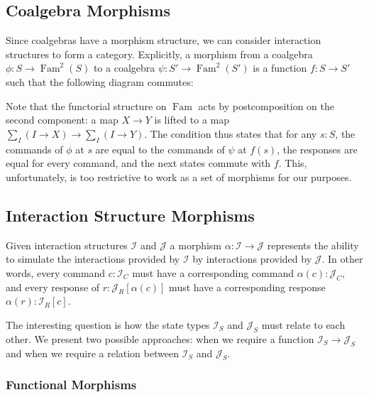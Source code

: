 \documentclass{article}
\theoremstyle{definition}
\newcommand{\mc}[1]{\mathcal{#1}}
\newcommand{\iss}[1]{\mathcal{#1}_S}
\newcommand{\isc}[1]{\mathcal{#1}_C}
\newcommand{\isr}[1]{\mathcal{#1}_R}
\DeclareMathOperator{\Fam}{Fam}
\begin{document}
    \subsection{Coalgebra Morphisms}

    Since coalgebras have a morphism
    structure, we can consider interaction structures to form a category.  Explicitly, a morphism from a coalgebra $\phi
    : S \to \Fam^2(S)$ to a coalgebra $\psi : S' \to \Fam^2(S')$ is a function $f : S \to S'$ such that the following
    diagram commutes:

    \begin{center}
    \end{center}

    Note that the functorial structure on $\Fam$ acts by postcomposition on the second component: a map $X \to Y$ is
    lifted to a map $\sum_I (I \to X) \to \sum_I (I \to Y)$.  The condition thus states that for any $s : S$, the
    commands of $\phi$ at $s$ are equal to the commands of $\psi$ at $f(s)$, the responses are equal for every command,
    and the next states commute with $f$.  This, unfortunately, is too restrictive to work as a set of morphisms for our
    purposes.

    \subsection{Interaction Structure Morphisms}

    Given interaction structures $\mc I$ and $\mc J$ a morphism $\alpha : \mc I \to \mc J$ represents the ability to
    simulate the interactions provided by $\mathcal{I}$ by interactions provided by $\mc J$.  In other words, every
    command $c : \isc I$ must have a corresponding command $\alpha(c) : \isc J$, and every response of $r : \isr
    J[\alpha(c)]$ must have a corresponding response $\alpha(r) : \isr I [c]$.

    The interesting question is how the state types $\iss I$ and $\iss J$ must relate to each other.  We present two
    possible approaches: when we require a function $\iss I \to \iss J$ and when we require a relation between $\iss I$
    and $\iss J$.

    \subsubsection{Functional Morphisms}
\end{document}

